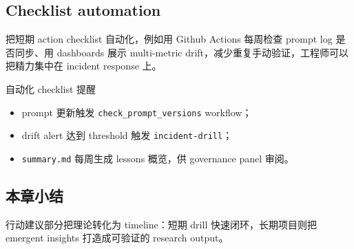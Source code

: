 \subsection{Checklist automation}

把短期 action checklist 自动化，例如用 Github Actions 每周检查 prompt log 是否同步、用 dashboards 展示 multi-metric drift，减少重复手动验证，工程师可以把精力集中在 incident response 上。

\begin{importantbox}{自动化 checklist 提醒}
\begin{itemize}
    \item prompt 更新触发 \texttt{check\_prompt\_versions} workflow；
    \item drift alert 达到 threshold 触发 \texttt{incident-drill}；
    \item \texttt{summary.md} 每周生成 lessons 概览，供 governance panel 审阅。
\end{itemize}
\end{importantbox}

\subsection{本章小结}

行动建议部分把理论转化为 timeline：短期 drill 快速闭环，长期项目则把 emergent insights 打造成可验证的 research output。

